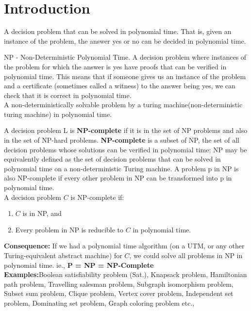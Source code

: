 \documentclass[a4paper,oneside]{book}
\begin{document}
\section{Introduction}
\begin{definition}[P]
 A decision problem that can be solved in polynomial time. That is, given an instance of the problem, the answer yes or no can be decided in polynomial time.
\end{definition}
\begin{definition}[NP]
NP - Non-Deterministic Polynomial Time. A decision problem where instances of the problem for which the answer is yes have proofs that can be verified in polynomial time. This means that if someone gives us an instance of the problem and a certificate (sometimes called a witness) to the answer being yes, we can check that it is correct in polynomial time. \\
A non-deterministically solvable problem by a turing machine(non-deterministic turing machine) in polynomial time.
\end{definition}
\begin{definition}[NP Complete]
A decision problem L is \textbf{NP-complete} if it is in the set of NP problems and also in the set of NP-hard problems. \textbf{NP-complete} is a subset of NP, the set of all decision problems whose solutions can be verified in polynomial time; NP may be equivalently defined as the set of decision problems that can be solved in polynomial time on a non-deterministic Turing machine. A problem p in NP is also NP-complete if every other problem in NP can be transformed into p in polynomial time.\\
A decision problem $C$ is NP-complete if:
\begin{enumerate}
\item $C$ is in NP, and
\item Every problem in NP is reducible to $C$ in polynomial time.
\end{enumerate}
\textbf{Consequence: }If we had a polynomial time algorithm (on a UTM, or any other Turing-equivalent abstract machine) for $C$, we could solve all problems in NP in polynomial time. ie., \textbf{P = NP = NP-Complete}\\
\textbf{Examples:}Boolean satisfiability problem (Sat.), Knapsack problem, Hamiltonian path problem, Travelling salesman problem, Subgraph isomorphism problem, Subset sum problem, Clique problem, Vertex cover problem, Independent set problem, Dominating set problem, Graph coloring problem etc.,
\end{definition}
\end{document}
